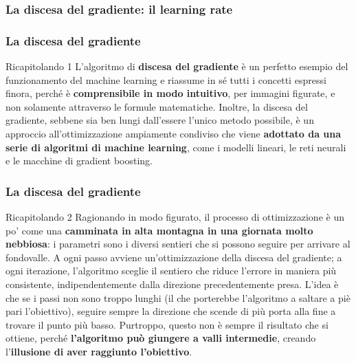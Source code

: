 \begin{frame}

	\frametitle{La discesa del gradiente: il learning rate}

		\centering

\end{frame}


\begin{frame}

	\frametitle{La discesa del gradiente}

	\begin{block}{Ricapitolando 1}
		L’algoritmo di \textbf{discesa del gradiente} è un perfetto esempio del funzionamento del machine learning e riassume in sé tutti i concetti espressi finora, perché è \textbf{comprensibile in modo intuitivo}, per immagini figurate, e non solamente attraverso le formule matematiche.
		\newlinedouble
		Inoltre, la discesa del gradiente, sebbene sia ben lungi dall’essere l’unico metodo possibile, è un approccio all’ottimizzazione ampiamente condiviso che viene \textbf{adottato da una serie di algoritmi di machine learning}, come i modelli lineari, le reti neurali e le macchine di gradient boosting.
	\end{block}

\end{frame}


\begin{frame}

	\frametitle{La discesa del gradiente}

	\begin{block}{Ricapitolando 2}
		Ragionando in modo figurato, il processo di ottimizzazione è un po’ come una \textbf{camminata in alta montagna in una giornata molto nebbiosa}: i parametri sono i diversi sentieri che si possono seguire per arrivare al fondovalle. A ogni passo avviene un’ottimizzazione della discesa del gradiente; a ogni iterazione, l’algoritmo sceglie il sentiero che riduce l’errore in maniera più consistente, indipendentemente dalla direzione precedentemente presa.
		\newlinedouble
		L’idea è che se i passi non sono troppo lunghi (il che porterebbe l’algoritmo a saltare a piè pari l’obiettivo), seguire sempre la direzione che scende di più porta alla fine a trovare il punto più basso. Purtroppo, questo non è sempre il risultato che si ottiene, perché \textbf{l’algoritmo può giungere a valli intermedie}, creando l’\textbf{illusione di aver raggiunto l’obiettivo}.
	\end{block}

\end{frame}


